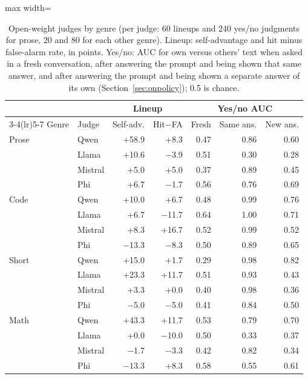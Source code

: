 \begin{table}[t]
\centering\small
\setlength\tabcolsep{3pt}
\begin{adjustbox}{max width=\linewidth}
\begin{tabular}{ll rr rrr}
\toprule
 & & \multicolumn{2}{c}{Lineup} & \multicolumn{3}{c}{Yes/no AUC} \\
\cmidrule(lr){3-4}\cmidrule(lr){5-7}
Genre & Judge & Self-adv. & Hit$-$FA & Fresh & Same ans. & New ans. \\
\midrule
Prose & Qwen & +58.9 & +8.3 & 0.47 & 0.86 & 0.60 \\
 & Llama & +10.6 & $-$3.9 & 0.51 & 0.30 & 0.28 \\
 & Mistral & +5.0 & +5.0 & 0.37 & 0.89 & 0.45 \\
 & Phi & +6.7 & $-$1.7 & 0.56 & 0.76 & 0.69 \\
\midrule
Code & Qwen & +10.0 & +6.7 & 0.48 & 0.99 & 0.76 \\
 & Llama & +6.7 & $-$11.7 & 0.64 & 1.00 & 0.71 \\
 & Mistral & +8.3 & +16.7 & 0.52 & 0.99 & 0.52 \\
 & Phi & $-$13.3 & $-$8.3 & 0.50 & 0.89 & 0.65 \\
\midrule
Short & Qwen & +15.0 & +1.7 & 0.29 & 0.98 & 0.82 \\
 & Llama & +23.3 & +11.7 & 0.51 & 0.93 & 0.43 \\
 & Mistral & +3.3 & +0.0 & 0.40 & 0.98 & 0.36 \\
 & Phi & $-$5.0 & $-$5.0 & 0.41 & 0.84 & 0.50 \\
\midrule
Math & Qwen & +43.3 & +11.7 & 0.53 & 0.79 & 0.70 \\
 & Llama & +0.0 & $-$10.0 & 0.50 & 0.33 & 0.37 \\
 & Mistral & $-$1.7 & $-$3.3 & 0.42 & 0.82 & 0.34 \\
 & Phi & $-$13.3 & +8.3 & 0.58 & 0.55 & 0.61 \\
\bottomrule
\end{tabular}
\end{adjustbox}
\caption{Open-weight judges by genre (per judge: 60 lineups and 240 yes/no judgments for prose, 20 and 80 for each other genre). Lineup: self-advantage and hit minus false-alarm rate, in points. Yes/no: AUC for own versus others' text when asked in a fresh conversation, after answering the prompt and being shown that same answer, and after answering the prompt and being shown a separate answer of its own (Section~\ref{sec:onpolicy}); 0.5 is chance.}
\label{tab:genre}
\end{table}
